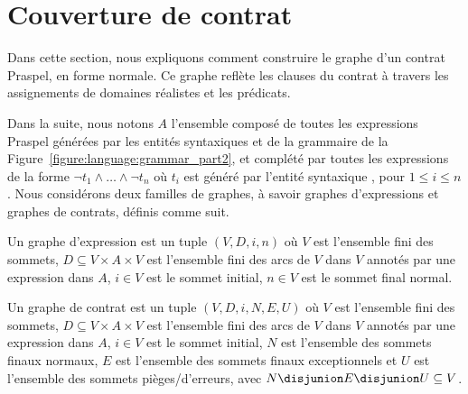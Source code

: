 \section{Couverture de contrat}
\label{section:test:contract}

Dans cette section, nous expliquons comment construire le graphe d'un contrat
Praspel, en forme normale. Ce graphe reflète les clauses du contrat à travers
les assignements de domaines réalistes et les prédicats.

Dans la suite, nous notons $A$ l'ensemble composé de toutes les expressions
Praspel générées par les entités syntaxiques  et
 de la grammaire de la
Figure~\ref{figure:language:grammar_part2}, et complété par toutes les
expressions de la forme $\neg t_1 \land \dots \land \neg t_n$ où $t_i$ est
généré par l'entité syntaxique , pour $1 \leq i \leq
n$. Nous considérons deux familles de graphes, à savoir {\strong graphes
d'expressions} et {\strong graphes de contrats}, définis comme suit.

\begin{definition}

Un {\strong graphe d'expression} est un tuple $(V, D, i, n)$ où $V$ est
l'ensemble fini des {\strong sommets}, $D \subseteq V \times A \times V$ est
l'ensemble fini des {\strong arcs} de $V$ dans $V$ annotés par une {\strong
expression} dans $A$, $i \in V$ est le {\strong sommet initial}, $n \in V$ est
le {\strong sommet final normal}.

\end{definition}

\begin{definition}

Un {\strong graphe de contrat} est un tuple $(V, D, i, N, E, U)$ où $V$ est
l'ensemble fini des {\strong sommets}, $D \subseteq V \times A \times V$ est
l'ensemble fini des {\strong arcs} de $V$ dans $V$ annotés par une expression
dans $A$, $i \in V$ est le {\strong sommet initial}, $N$ est l'ensemble des
{\strong sommets finaux normaux}, $E$ est l'ensemble des {\strong sommets finaux
exceptionnels} et $U$ est l'ensemble des {\strong sommets pièges/d'erreurs},
avec $N \disjunion E \disjunion U \subseteq V$.

\end{definition}

